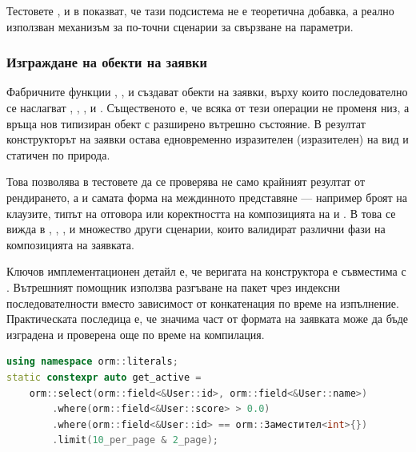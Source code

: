 Тестовете ,  и  в  показват, че тази подсистема не е теоретична добавка, а реално използван механизъм за по-точни сценарии за свързване на параметри.

\subsubsection{Изграждане на обекти на заявки}

Фабричните функции , ,  и  създават обекти на заявки, върху които последователно се наслагват , , ,  и . Същественото е, че всяка от тези операции не променя низ, а връща нов типизиран обект с разширено вътрешно състояние. В резултат конструкторът на заявки остава едновременно изразителен (изразителен) на вид и статичен по природа.

Това позволява в тестовете да се проверява не само крайният резултат от рендирането, а и самата форма на междинното представяне --- например броят на  клаузите, типът на отговора или коректността на композицията на  и . В  това се вижда в , , ,  и множество други сценарии, които валидират различни фази на композицията на заявката.

Ключов имплементационен детайл е, че веригата на конструктора е съвместима с . Вътрешният помощник  използва разгъване на пакет чрез индексни последователности вместо зависимост от конкатенация по време на изпълнение. Практическата последица е, че значима част от формата на заявката може да бъде изградена и проверена още по време на компилация.

\begin{lstlisting}[language=C++,caption={Обект на заявка, деклариран като константа по време на компилация},label={lst:constexpr_query}]
using namespace orm::literals;
static constexpr auto get_active =
    orm::select(orm::field<&User::id>, orm::field<&User::name>)
        .where(orm::field<&User::score> > 0.0)
        .where(orm::field<&User::id> == orm::Заместител<int>{})
        .limit(10_per_page & 2_page);
\end{lstlisting}

